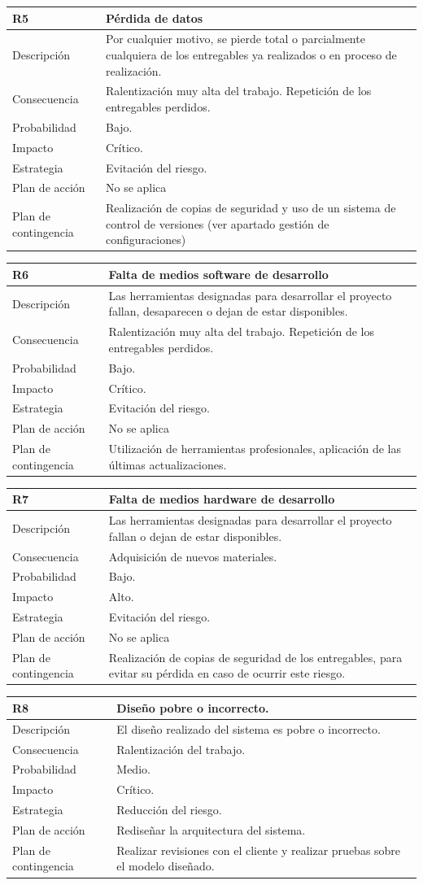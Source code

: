 \documentclass[twoside]{report}
\newcommand\addrow[2]{#1 &#2\\ }
\newcommand\addheading[2]{#1 &#2\\ \hline}
\newcommand\tabularhead{\begin{tabular}{lp{0.7\textwidth}}
\hline
}
\newenvironment{risk}{\tabularhead}
{\hline\end{tabular}}
\begin{document}
\vspace{0.5cm}

\begin{risk}
  \addheading{R5}{Pérdida de datos}
  \addrow{Descripción}{Por cualquier motivo, se pierde total o parcialmente cualquiera de los entregables ya realizados o en proceso de realización.}
  \addrow{Consecuencia}{Ralentización muy alta del trabajo. Repetición de los entregables perdidos. }
  \addrow{Probabilidad}{Bajo.}
  \addrow{Impacto}{Crítico. }
  \addrow{Estrategia}{Evitación del riesgo.}
  \addrow{Plan de acción}{No se aplica}
  \addrow{Plan de contingencia}{Realización de copias de seguridad y uso de un sistema de control de versiones (ver apartado gestión de configuraciones)}
\end{risk}

\vspace{0.5cm}

\begin{risk}
  \addheading{R6}{Falta de medios software de desarrollo}
  \addrow{Descripción}{Las herramientas designadas para desarrollar el proyecto fallan, desaparecen o dejan de estar disponibles.}
  \addrow{Consecuencia}{Ralentización muy alta del trabajo. Repetición de los entregables perdidos. }
  \addrow{Probabilidad}{Bajo.}
  \addrow{Impacto}{Crítico. }
  \addrow{Estrategia}{Evitación del riesgo.}
  \addrow{Plan de acción}{No se aplica}
  \addrow{Plan de contingencia}{Utilización de herramientas profesionales, aplicación de las últimas actualizaciones.}
\end{risk}

\vspace{0.5cm}

\begin{risk}
  \addheading{R7}{Falta de medios hardware de desarrollo}
  \addrow{Descripción}{Las herramientas designadas para desarrollar el proyecto fallan o dejan de estar disponibles.}
  \addrow{Consecuencia}{Adquisición de nuevos materiales.}
  \addrow{Probabilidad}{Bajo.}
  \addrow{Impacto}{Alto. }
  \addrow{Estrategia}{Evitación del riesgo.}
  \addrow{Plan de acción}{No se aplica}
  \addrow{Plan de contingencia}{Realización de copias de seguridad de los entregables, para evitar su pérdida en caso de ocurrir este riesgo.}
\end{risk}

\vspace{0.5cm}

\begin{risk}
  \addheading{R8}{Diseño pobre o incorrecto.} 
  \addrow{Descripción}{El diseño realizado del sistema es pobre o incorrecto.}
  \addrow{Consecuencia}{Ralentización del trabajo.}
  \addrow{Probabilidad}{Medio.}
  \addrow{Impacto}{Crítico. }
  \addrow{Estrategia}{Reducción del riesgo.}
  \addrow{Plan de acción}{Rediseñar la arquitectura del sistema.}
  \addrow{Plan de contingencia}{Realizar revisiones con el cliente y realizar pruebas sobre el modelo diseñado.}
\end{risk}
\end{document}
